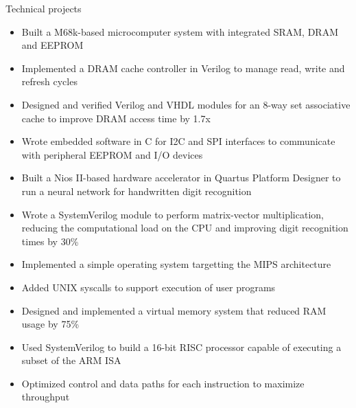 \documentclass{resume} %
\begin{document}
\begin{workSection}{Technical projects}
    \customItem[
        title=Motorola 68000 Microcomputer System,
        duration=January 2025 - April 2025,
    ]
    \vspace{-1.5em}
    \begin{itemize}
        \itemsep -6pt {}
        \item Built a M68k-based microcomputer system with integrated SRAM, DRAM and EEPROM
        \item Implemented a DRAM cache controller in Verilog to manage read, write and refresh cycles
        \item Designed and verified Verilog and VHDL modules for an 8-way set associative cache to improve DRAM access time by 1.7x
        \item Wrote embedded software in C for I2C and SPI interfaces to communicate with peripheral EEPROM and I/O devices
    \end{itemize}
    \customItem[
        title=Embedded Deep Neural Network Accelerator,
        duration=November 2024,
    ]
    \vspace{-1.5em}
    \begin{itemize}
        \itemsep -6pt {}
        \item Built a Nios II-based hardware accelerator in Quartus Platform Designer to run a neural network for handwritten digit recognition
        \item Wrote a SystemVerilog module to perform matrix-vector multiplication, reducing the computational load on the CPU and improving digit recognition times by 30\%
    \end{itemize}
     \customItem[
        title=Operating System Kernel,
        duration=September 2023 - December 2023,
     ]
    \vspace{-1.5em}
     \begin{itemize}
        \itemsep -6pt {}
        \item Implemented a simple operating system targetting the MIPS architecture
        \item Added UNIX syscalls to support execution of user programs
        \item Designed and implemented a virtual memory system that reduced RAM usage by 75\%
     \end{itemize}
     \customItem[
        title=RISC Processor,
        duration=October 2022 - December 2022,
     ]
    \vspace{-1.5em}
     \begin{itemize}
        \itemsep -6pt {}
        \item Used SystemVerilog to build a 16-bit RISC processor capable of executing a subset of the ARM ISA
        \item Optimized control and data paths for each instruction to maximize throughput
    \end{itemize}

\end{workSection}
\end{document}
